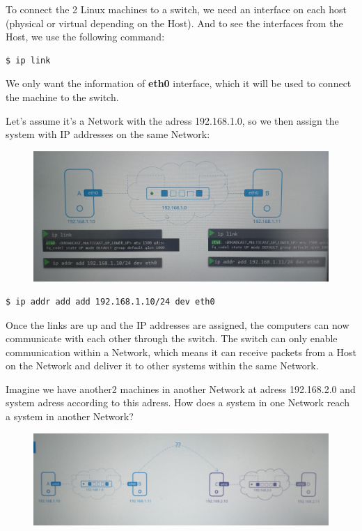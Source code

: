\documentclass{article}
\newenvironment{codetemplate}[1][]{%
  \mybasecolorbox[#1]
  \itshape
}{%
  \endmybasecolorbox
}
\begin{document}
To connect the 2 Linux machines to a switch, we need an interface on each host (physical or virtual depending on the Host). And to see the interfaces from the Host, we use the following command:

\begin{codetemplate}{}
\begin{verbatim}
$ ip link
\end{verbatim}
\end{codetemplate}

We only want the information of \textbf{eth0} interface, which it will be used to connect the machine to the switch. 

Let's assume it's a Network with the adress 192.168.1.0, so we then assign the system with IP addresses on the same Network:

\begin{figure}[H]
    \includegraphics[width=\textwidth]{pictures/ntw2.png}
\end{figure}

\begin{codetemplate}{}
\begin{verbatim}
$ ip addr add add 192.168.1.10/24 dev eth0
\end{verbatim}
\end{codetemplate}

Once the links are up and the IP addresses are assigned, the computers can now communicate with each other through the switch. The switch can only enable communication within a Network, which means it can receive packets from a Host on the Network and deliver it to other systems within the same Network.

Imagine we have another2 machines in another Network at adress 192.168.2.0 and system adress according to this adress. How does a system in one Network reach a system in another Network?

\begin{figure}[H]
    \includegraphics[width=\textwidth]{pictures/ntw3.png}
\end{figure}
\end{document}
